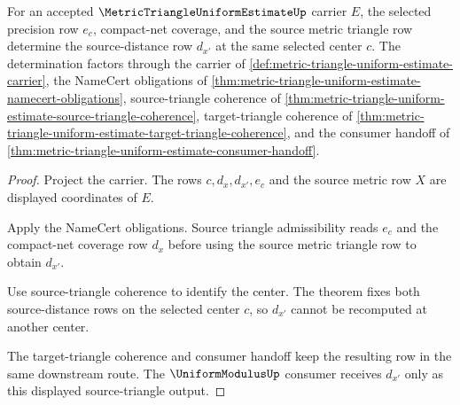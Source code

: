 \begin{theorem}
\label{thm:metric-triangle-uniform-estimate-radius-composition}
For an accepted $\MetricTriangleUniformEstimateUp$ carrier $E$, the selected precision row $e_c$, compact-net coverage, and the source metric triangle row determine the source-distance row $d_{x'}$ at the same selected center $c$. The determination factors through the carrier of \autoref{def:metric-triangle-uniform-estimate-carrier}, the NameCert obligations of \autoref{thm:metric-triangle-uniform-estimate-namecert-obligations}, source-triangle coherence of \autoref{thm:metric-triangle-uniform-estimate-source-triangle-coherence}, target-triangle coherence of \autoref{thm:metric-triangle-uniform-estimate-target-triangle-coherence}, and the consumer handoff of \autoref{thm:metric-triangle-uniform-estimate-consumer-handoff}.
\end{theorem}
\begin{proof}
Project the carrier. The rows $c,d_x,d_{x'},e_c$ and the source metric row $X$ are displayed coordinates of $E$.

Apply the NameCert obligations. Source triangle admissibility reads $e_c$ and the compact-net coverage row $d_x$ before using the source metric triangle row to obtain $d_{x'}$.

Use source-triangle coherence to identify the center. The theorem fixes both source-distance rows on the selected center $c$, so $d_{x'}$ cannot be recomputed at another center.

The target-triangle coherence and consumer handoff keep the resulting row in the same downstream route. The $\UniformModulusUp$ consumer receives $d_{x'}$ only as this displayed source-triangle output.
\end{proof}

